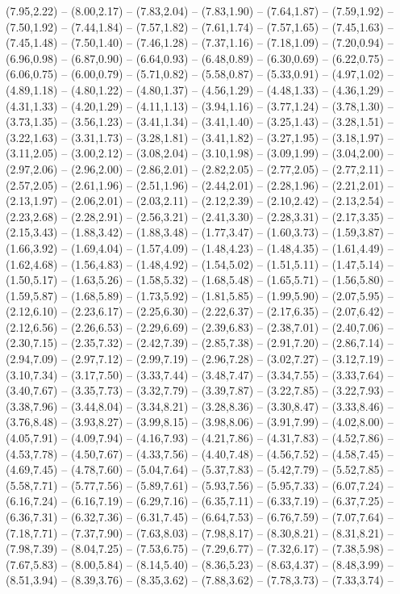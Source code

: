 {  (7.95,2.22) -- (8.00,2.17) -- (7.83,2.04) -- (7.83,1.90) -- (7.64,1.87) -- (7.59,1.92) -- (7.50,1.92) -- (7.44,1.84) -- (7.57,1.82) -- (7.61,1.74) -- (7.57,1.65) -- (7.45,1.63) -- (7.45,1.48) -- (7.50,1.40) -- (7.46,1.28) -- (7.37,1.16) -- (7.18,1.09) -- (7.20,0.94) -- (6.96,0.98) -- (6.87,0.90) -- (6.64,0.93) -- (6.48,0.89) -- (6.30,0.69) -- (6.22,0.75) -- (6.06,0.75) -- (6.00,0.79) -- (5.71,0.82) -- (5.58,0.87) -- (5.33,0.91) -- (4.97,1.02) -- (4.89,1.18) -- (4.80,1.22) -- (4.80,1.37) -- (4.56,1.29) -- (4.48,1.33) -- (4.36,1.29) -- (4.31,1.33) -- (4.20,1.29) -- (4.11,1.13) -- (3.94,1.16) -- (3.77,1.24) -- (3.78,1.30) -- (3.73,1.35) -- (3.56,1.23) -- (3.41,1.34) -- (3.41,1.40) -- (3.25,1.43) -- (3.28,1.51) -- (3.22,1.63) -- (3.31,1.73) -- (3.28,1.81) -- (3.41,1.82) -- (3.27,1.95) -- (3.18,1.97) -- (3.11,2.05) -- (3.00,2.12) -- (3.08,2.04) -- (3.10,1.98) -- (3.09,1.99) -- (3.04,2.00) -- (2.97,2.06) -- (2.96,2.00) -- (2.86,2.01) -- (2.82,2.05) -- (2.77,2.05) -- (2.77,2.11) -- (2.57,2.05) -- (2.61,1.96) -- (2.51,1.96) -- (2.44,2.01) -- (2.28,1.96) -- (2.21,2.01) -- (2.13,1.97) -- (2.06,2.01) -- (2.03,2.11) -- (2.12,2.39) -- (2.10,2.42) -- (2.13,2.54) -- (2.23,2.68) -- (2.28,2.91) -- (2.56,3.21) -- (2.41,3.30) -- (2.28,3.31) -- (2.17,3.35) -- (2.15,3.43) -- (1.88,3.42) -- (1.88,3.48) -- (1.77,3.47) -- (1.60,3.73) -- (1.59,3.87) -- (1.66,3.92) -- (1.69,4.04) -- (1.57,4.09) -- (1.48,4.23) -- (1.48,4.35) -- (1.61,4.49) -- (1.62,4.68) -- (1.56,4.83) -- (1.48,4.92) -- (1.54,5.02) -- (1.51,5.11) -- (1.47,5.14) -- (1.50,5.17) -- (1.63,5.26) -- (1.58,5.32) -- (1.68,5.48) -- (1.65,5.71) -- (1.56,5.80) -- (1.59,5.87) -- (1.68,5.89) -- (1.73,5.92) -- (1.81,5.85) -- (1.99,5.90) -- (2.07,5.95) -- (2.12,6.10) -- (2.23,6.17) -- (2.25,6.30) -- (2.22,6.37) -- (2.17,6.35) -- (2.07,6.42) -- (2.12,6.56) -- (2.26,6.53) -- (2.29,6.69) -- (2.39,6.83) -- (2.38,7.01) -- (2.40,7.06) -- (2.30,7.15) -- (2.35,7.32) -- (2.42,7.39) -- (2.85,7.38) -- (2.91,7.20) -- (2.86,7.14) -- (2.94,7.09) -- (2.97,7.12) -- (2.99,7.19) -- (2.96,7.28) -- (3.02,7.27) -- (3.12,7.19) -- (3.10,7.34) -- (3.17,7.50) -- (3.33,7.44) -- (3.48,7.47) -- (3.34,7.55) -- (3.33,7.64) -- (3.40,7.67) -- (3.35,7.73) -- (3.32,7.79) -- (3.39,7.87) -- (3.22,7.85) -- (3.22,7.93) -- (3.38,7.96) -- (3.44,8.04) -- (3.34,8.21) -- (3.28,8.36) -- (3.30,8.47) -- (3.33,8.46) -- (3.76,8.48) -- (3.93,8.27) -- (3.99,8.15) -- (3.98,8.06) -- (3.91,7.99) -- (4.02,8.00) -- (4.05,7.91) -- (4.09,7.94) -- (4.16,7.93) -- (4.21,7.86) -- (4.31,7.83) -- (4.52,7.86) -- (4.53,7.78) -- (4.50,7.67) -- (4.33,7.56) -- (4.40,7.48) -- (4.56,7.52) -- (4.58,7.45) -- (4.69,7.45) -- (4.78,7.60) -- (5.04,7.64) -- (5.37,7.83) -- (5.42,7.79) -- (5.52,7.85) -- (5.58,7.71) -- (5.77,7.56) -- (5.89,7.61) -- (5.93,7.56) -- (5.95,7.33) -- (6.07,7.24) -- (6.16,7.24) -- (6.16,7.19) -- (6.29,7.16) -- (6.35,7.11) -- (6.33,7.19) -- (6.37,7.25) -- (6.36,7.31) -- (6.32,7.36) -- (6.31,7.45) -- (6.64,7.53) -- (6.76,7.59) -- (7.07,7.64) -- (7.18,7.71) -- (7.37,7.90) -- (7.63,8.03) -- (7.98,8.17) -- (8.30,8.21) -- (8.31,8.21) -- (7.98,7.39) -- (8.04,7.25) -- (7.53,6.75) -- (7.29,6.77) -- (7.32,6.17) -- (7.38,5.98) -- (7.67,5.83) -- (8.00,5.84) -- (8.14,5.40) -- (8.36,5.23) -- (8.63,4.37) -- (8.48,3.99) -- (8.51,3.94) -- (8.39,3.76) -- (8.35,3.62) -- (7.88,3.62) -- (7.78,3.73) -- (7.33,3.74) -- }
